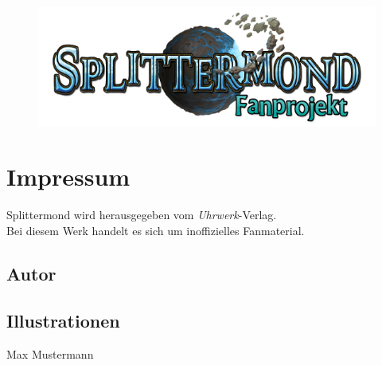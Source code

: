 \documentclass[12pt, a4paper, twoside, openany]{book}
\begin{document}
{%

        {%
                \begin{center}
                        \color{spmblue}
                        \fontsize{40}{50}
                        \selectfont
                        \textbf{\MyTitle}
                \end{center}
        }%
        \begin{figure}[t]
                \centering
                \includegraphics[scale=0.8]{bilder/Splittermond-Logo_fan_v2.png}
        \end{figure}

        \vfill
        \section*{Impressum}%
        \begin{center}
                Splittermond wird herausgegeben vom \textit{Uhrwerk}-Verlag.\\
                Bei diesem Werk handelt es sich um inoffizielles Fanmaterial.        
        \end{center}
        \subsection*{Autor}
        \begin{center} 
                \MyAuthor
        \end{center}
        \subsection*{Illustrationen}
        \begin{center}
                Max Mustermann        
        \end{center}

}
\end{document}

